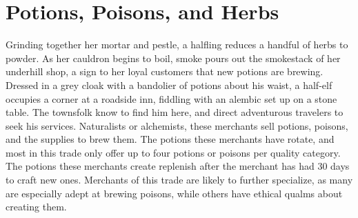 \documentclass[10pt,a4paper,twoside,twocolumn,openany,nodeprecatedcode,bg=print]{dndbook}
\begin{document}
\section{Potions, Poisons, and Herbs}
Grinding together her mortar and pestle, a halfling reduces a handful of herbs to powder. As her cauldron begins to boil, smoke pours out the smokestack of her underhill shop, a sign to her loyal customers that new potions are brewing.
Dressed in a grey cloak with a bandolier of potions about his waist, a half-elf occupies a corner at a roadside inn, fiddling with an alembic set up on a stone table. The townsfolk know to find him here, and direct adventurous travelers to seek his services.
Naturalists or alchemists, these merchants sell potions, poisons, and the supplies to brew them. The potions these merchants have rotate, and most in this trade only offer up to four potions or poisons per quality category. The potions these merchants create replenish after the merchant has had 30 days to craft new ones.
Merchants of this trade are likely to further specialize, as many are especially adept at brewing poisons, while others have ethical qualms about creating them.
\end{document}
